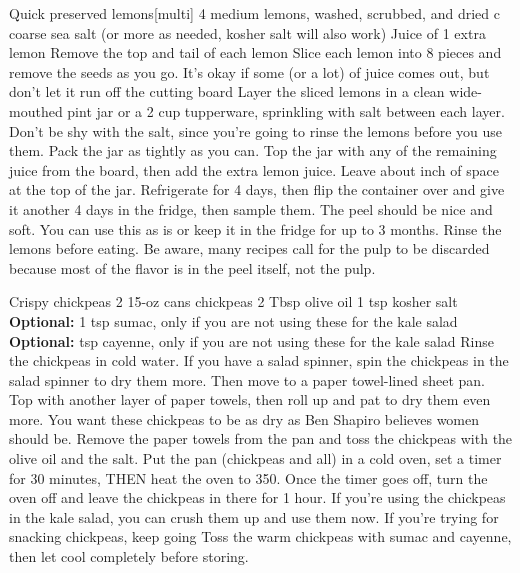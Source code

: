\documentclass[../cookbook.tex]{subfiles}
\begin{document}
\begin{recipe}{Quick preserved lemons}[multi]
\ingredients
{4 medium lemons, washed, scrubbed, and dried}
{ c coarse sea salt (or more as needed, kosher salt will also work)}
{Juice of 1 extra lemon}
\stopingredients
\vspace{-0.3cm}
\preparation
{Remove the top and tail of each lemon}
{Slice each lemon into 8 pieces and remove the seeds as you go. It's okay if some (or a lot) of juice comes out, but don't let it run off the cutting board}
{Layer the sliced lemons in a clean wide-mouthed pint jar or a 2 cup tupperware, sprinkling with salt between each layer. Don't be shy with the salt, since you're going to rinse the lemons before you use them. Pack the jar as tightly as you can.}
{Top the jar with any of the remaining juice from the board, then add the extra lemon juice. Leave about  inch of space at the top of the jar.}
{Refrigerate for 4 days, then flip the container over and give it another 4 days in the fridge, then sample them. The peel should be nice and soft. You can use this as is or keep it in the fridge for up to 3 months.}
{Rinse the lemons before eating. Be aware, many recipes call for the pulp to be discarded because most of the flavor is in the peel itself, not the pulp.}
\stopprep
\end{recipe}
\begin{recipe}{Crispy chickpeas}
\ingredients
{2 15-oz cans chickpeas}
{2 Tbsp olive oil}
{1 tsp kosher salt}
{\textbf{Optional:} 1 tsp sumac, only if you are not using these for the kale salad}
{\textbf{Optional:}  tsp cayenne, only if you are not using these for the kale salad}
\stopingredients
\preparation
{Rinse the chickpeas in cold water. If you have a salad spinner, spin the chickpeas in the salad spinner to dry them more. Then move to a paper towel-lined sheet pan. Top with another layer of paper towels, then roll up and pat to dry them even more. You want these chickpeas to be as dry as Ben Shapiro believes women should be.}
{Remove the paper towels from the pan and toss the chickpeas with the olive oil and the salt. Put the pan (chickpeas and all) in a cold oven, set a timer for 30 minutes, THEN heat the oven to 350.}
{Once the timer goes off, turn the oven off and leave the chickpeas in there for 1 hour.}
{If you're using the chickpeas in the kale salad, you can crush them up and use them now. If you're trying for snacking chickpeas, keep going}
{Toss the warm chickpeas with sumac and cayenne, then let cool completely before storing.}
\stopprep
\end{recipe}
\end{document}
